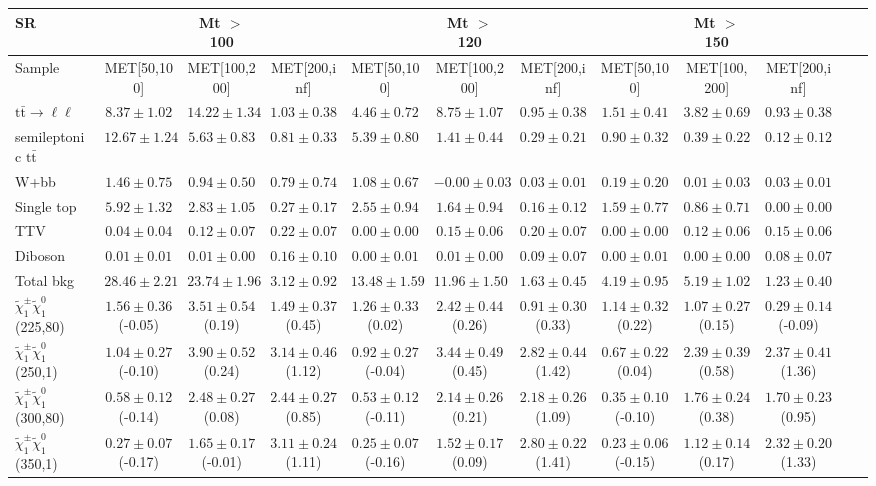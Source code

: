\begin{table}
\begin{center}
\small
\begin{tabular}{lccccccccccc}
\hline
SR & & Mt $>$ 100 & & & Mt $>$ 120 & & &Mt $>$ 150 & & &\\
\hline
Sample&MET[50,100]&MET[100,200]&MET[200,inf]&MET[50,100]&MET[100,200]&MET[200,inf]&MET[50,100]&MET[100,200]&MET[200,inf]&\\
\hline
$\mathrm{t}\bar{\mathrm{t}}\rightarrow \ell\ell$&$8.37\pm1.02$&$14.22\pm1.34$&$1.03\pm0.38$&$4.46\pm0.72$&$8.75\pm1.07$&$0.95\pm0.38$&$1.51\pm0.41$&$3.82\pm0.69$&$0.93\pm0.38$\\
semileptonic $\mathrm{t}\bar{\mathrm{t}}$&$12.67\pm1.24$&$5.63\pm0.83$&$0.81\pm0.33$&$5.39\pm0.80$&$1.41\pm0.44$&$0.29\pm0.21$&$0.90\pm0.32$&$0.39\pm0.22$&$0.12\pm0.12$\\
W+bb&$1.46\pm0.75$&$0.94\pm0.50$&$0.79\pm0.74$&$1.08\pm0.67$&$-0.00\pm0.03$&$0.03\pm0.01$&$0.19\pm0.20$&$0.01\pm0.03$&$0.03\pm0.01$\\
Single top&$5.92\pm1.32$&$2.83\pm1.05$&$0.27\pm0.17$&$2.55\pm0.94$&$1.64\pm0.94$&$0.16\pm0.12$&$1.59\pm0.77$&$0.86\pm0.71$&$0.00\pm0.00$\\
TTV&$0.04\pm0.04$&$0.12\pm0.07$&$0.22\pm0.07$&$0.00\pm0.00$&$0.15\pm0.06$&$0.20\pm0.07$&$0.00\pm0.00$&$0.12\pm0.06$&$0.15\pm0.06$\\
Diboson&$0.01\pm0.01$&$0.01\pm0.00$&$0.16\pm0.10$&$0.00\pm0.01$&$0.01\pm0.00$&$0.09\pm0.07$&$0.00\pm0.01$&$0.00\pm0.00$&$0.08\pm0.07$\\
\hline
Total bkg&$28.46\pm2.21$&$23.74\pm1.96$&$3.12\pm0.92$&$13.48\pm1.59$&$11.96\pm1.50$&$1.63\pm0.45$&$4.19\pm0.95$&$5.19\pm1.02$&$1.23\pm0.40$\\
$\tilde{\chi}_{1}^{\pm}\tilde{\chi}_{1}^{0}$ (225,80)&$1.56\pm0.36$(-0.05)&$3.51\pm0.54$(0.19)&$1.49\pm0.37$(0.45)&$1.26\pm0.33$(0.02)&$2.42\pm0.44$(0.26)&$0.91\pm0.30$(0.33)&$1.14\pm0.32$(0.22)&$1.07\pm0.27$(0.15)&$0.29\pm0.14$(-0.09)\\
$\tilde{\chi}_{1}^{\pm}\tilde{\chi}_{1}^{0}$ (250,1)&$1.04\pm0.27$(-0.10)&$3.90\pm0.52$(0.24)&$3.14\pm0.46$(1.12)&$0.92\pm0.27$(-0.04)&$3.44\pm0.49$(0.45)&$2.82\pm0.44$(1.42)&$0.67\pm0.22$(0.04)&$2.39\pm0.39$(0.58)&$2.37\pm0.41$(1.36)\\
$\tilde{\chi}_{1}^{\pm}\tilde{\chi}_{1}^{0}$ (300,80)&$0.58\pm0.12$(-0.14)&$2.48\pm0.27$(0.08)&$2.44\pm0.27$(0.85)&$0.53\pm0.12$(-0.11)&$2.14\pm0.26$(0.21)&$2.18\pm0.26$(1.09)&$0.35\pm0.10$(-0.10)&$1.76\pm0.24$(0.38)&$1.70\pm0.23$(0.95)\\
$\tilde{\chi}_{1}^{\pm}\tilde{\chi}_{1}^{0}$ (350,1)&$0.27\pm0.07$(-0.17)&$1.65\pm0.17$(-0.01)&$3.11\pm0.24$(1.11)&$0.25\pm0.07$(-0.16)&$1.52\pm0.17$(0.09)&$2.80\pm0.22$(1.41)&$0.23\pm0.06$(-0.15)&$1.12\pm0.14$(0.17)&$2.32\pm0.20$(1.33)\\
\hline
\hline\hline
\end{tabular}
\end{center}
\end{table}
